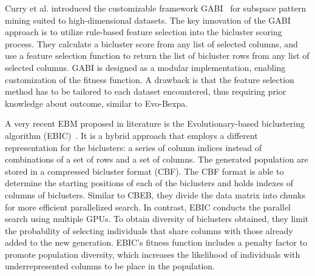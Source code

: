 Curry et al. introduced the customizable framework GABI~\cite{curry2014framework} for subspace pattern mining suited to high-dimensional datasets.
The key innovation of the GABI approach is to utilize rule-based feature selection into the bicluster scoring process.
They calculate a bicluster score from any list of selected columns, and use a feature selection function to return the list of bicluster rows from any list of selected columns.
GABI is designed as a modular implementation, enabling customization of the fitness function.
A drawback is that the feature selection method has to be tailored to each dataset encountered, thus requiring prior knowledge about outcome, similar to Evo-Bexpa.


A very recent EBM proposed in literature is the Evolutionary-based biclustering algorithm (EBIC)~\cite{orzechowski2018ebic}.
It is a hybrid approach that employs a different representation for the biclusters: a series of column indices instead of combinations of a set of rows and a set of columns.
The generated population are stored in a compressed bicluster format (CBF).
The CBF format is able to determine the starting positions of each of the biclusters and holds indexes of columns of biclusters.
Similar to CBEB, they divide the data matrix into chunks for more efficient parallelized search.
In contrast, EBIC conducts the parallel search using multiple GPUs.
To obtain diversity of biclusters obtained, they limit the probability of selecting individuals that share columns with those already added to the new generation.
EBIC's fitness function includes a penalty factor to promote population diversity, which increases the likelihood of individuals with underrepresented columns to be place in the population.

